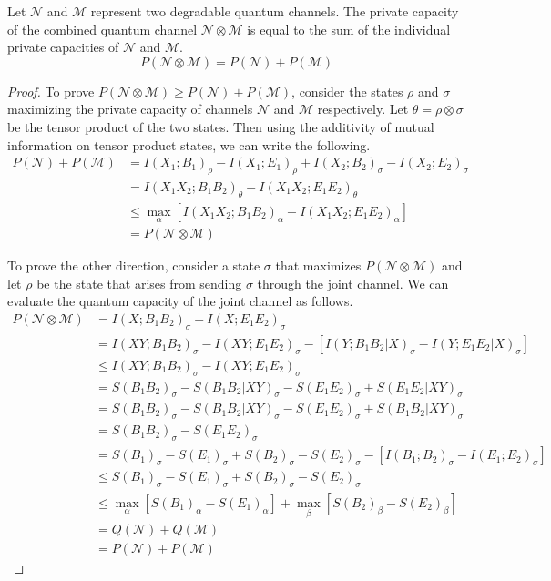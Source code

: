 \begin{theorem}
Let $\mathcal{N}$ and $\mathcal{M}$ represent two degradable quantum channels. The private capacity of the combined quantum channel $\mathcal{N} \otimes \mathcal{M}$ is equal to the sum of the individual private capacities of $\mathcal{N}$ and $\mathcal{M}$.
$$P(\mathcal{N} \otimes \mathcal{M}) = P(\mathcal{N}) + P(\mathcal{M})$$
\end{theorem}

\begin{proof}
To prove $P(\mathcal{N} \otimes \mathcal{M}) \geq P(\mathcal{N}) + P(\mathcal{M})$, consider the states $\rho$ and $\sigma$ maximizing the private capacity of channels $\mathcal{N}$ and $\mathcal{M}$ respectively. Let $\theta = \rho \otimes \sigma$ be the tensor product of the two states. Then using the additivity of mutual information on tensor product states, we can write the following.
\begin{align*}
P(\mathcal{N}) + P(\mathcal{M}) &= I(X_1;B_1)_{\rho} - I(X_1;E_1)_{\rho} + I(X_2;B_2)_{\sigma} - I(X_2;E_2)_{\sigma} \\
&= I(X_1X_2;B_1B_2)_{\theta} - I(X_1X_2;E_1E_2)_{\theta} \\
&\leq \max_{\alpha} \left[ I(X_1X_2;B_1B_2)_{\alpha} - I(X_1X_2;E_1E_2)_{\alpha} \right] \\
&= P(\mathcal{N} \otimes \mathcal{M})
\end{align*}

To prove the other direction, consider a state $\sigma$ that maximizes $P(\mathcal{N} \otimes \mathcal{M})$ and let $\rho$ be the state that arises from sending $\sigma$ through the joint channel. We can evaluate the quantum capacity of the joint channel as follows.
\begin{align*}
P(\mathcal{N} \otimes \mathcal{M}) &= I(X; B_1B_2)_\sigma - I(X; E_1E_2)_\sigma \\
&= I(XY; B_1B_2)_\sigma - I(XY; E_1E_2)_\sigma - [I(Y; B_1B_2|X)_\sigma - I(Y; E_1E_2|X)_\sigma] \\
&\leq I(XY; B_1B_2)_\sigma - I(XY; E_1E_2)_\sigma \\
&= S(B_1B_2)_\sigma - S(B_1B_2|XY)_\sigma - S(E_1E_2)_\sigma + S(E_1E_2|XY)_\sigma \\
&= S(B_1B_2)_\sigma - S(B_1B_2|XY)_\sigma - S(E_1E_2)_\sigma + S(B_1B_2|XY)_\sigma \\
&= S(B_1B_2)_\sigma - S(E_1E_2)_\sigma \\
&= S(B_1)_\sigma - S(E_1)_\sigma + S(B_2)_\sigma - S(E_2)_\sigma - [I(B_1; B_2)_\sigma - I(E_1; E_2)_\sigma] \\
&\leq S(B_1)_\sigma - S(E_1)_\sigma + S(B_2)_\sigma - S(E_2)_\sigma \\
&\leq \max_\alpha \left[ S(B_1)_\alpha - S(E_1)_\alpha \right] + \max_\beta \left[ S(B_2)_\beta - S(E_2)_\beta \right] \\
&= Q(\mathcal{N}) + Q(\mathcal{M}) \\
&= P(\mathcal{N}) + P(\mathcal{M})
\end{align*}


\end{proof}
